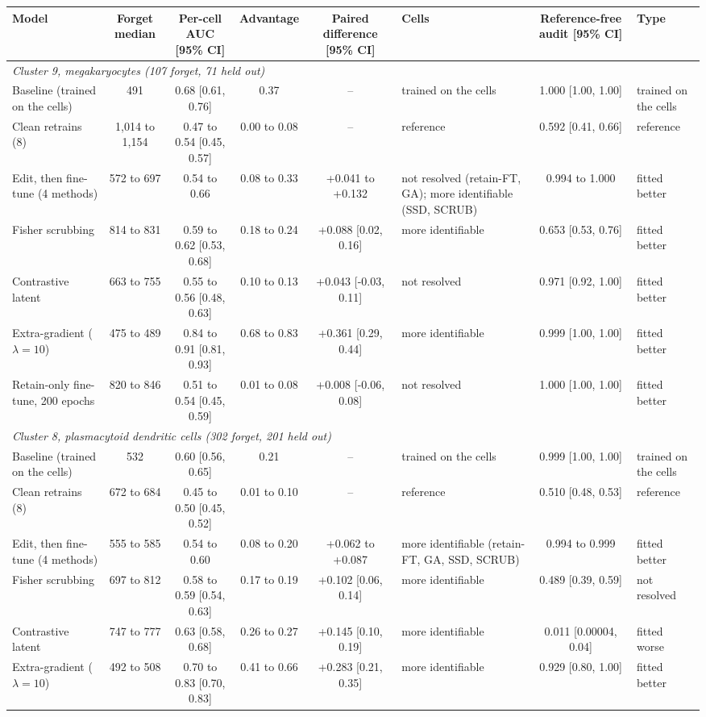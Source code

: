 \begin{tabular}{lcccc>{\raggedright\arraybackslash}p{2.8cm}cl}
\toprule
Model & Forget median & Per-cell AUC [95\% CI] & Advantage & Paired difference [95\% CI] & Cells & Reference-free audit [95\% CI] & Type \\
\midrule
\multicolumn{8}{l}{\emph{Cluster 9, megakaryocytes (107 forget, 71 held out)}} \\
Baseline (trained on the cells) & 491 & 0.68 [0.61, 0.76] & 0.37 & -- & trained on the cells & 1.000 [1.00, 1.00] & trained on the cells \\
Clean retrains (8) & 1,014 to 1,154 & 0.47 to 0.54 [0.45, 0.57] & 0.00 to 0.08 & -- & reference & 0.592 [0.41, 0.66] & reference \\
Edit, then fine-tune (4 methods) & 572 to 697 & 0.54 to 0.66 & 0.08 to 0.33 & +0.041 to +0.132 & not resolved (retain-FT, GA); more identifiable (SSD, SCRUB) & 0.994 to 1.000 & fitted better \\
Fisher scrubbing & 814 to 831 & 0.59 to 0.62 [0.53, 0.68] & 0.18 to 0.24 & +0.088 [0.02, 0.16] & more identifiable & 0.653 [0.53, 0.76] & fitted better \\
Contrastive latent & 663 to 755 & 0.55 to 0.56 [0.48, 0.63] & 0.10 to 0.13 & +0.043 [-0.03, 0.11] & not resolved & 0.971 [0.92, 1.00] & fitted better \\
Extra-gradient ($\lambda=10$) & 475 to 489 & 0.84 to 0.91 [0.81, 0.93] & 0.68 to 0.83 & +0.361 [0.29, 0.44] & more identifiable & 0.999 [1.00, 1.00] & fitted better \\
Retain-only fine-tune, 200 epochs & 820 to 846 & 0.51 to 0.54 [0.45, 0.59] & 0.01 to 0.08 & +0.008 [-0.06, 0.08] & not resolved & 1.000 [1.00, 1.00] & fitted better \\
\midrule
\multicolumn{8}{l}{\emph{Cluster 8, plasmacytoid dendritic cells (302 forget, 201 held out)}} \\
Baseline (trained on the cells) & 532 & 0.60 [0.56, 0.65] & 0.21 & -- & trained on the cells & 0.999 [1.00, 1.00] & trained on the cells \\
Clean retrains (8) & 672 to 684 & 0.45 to 0.50 [0.45, 0.52] & 0.01 to 0.10 & -- & reference & 0.510 [0.48, 0.53] & reference \\
Edit, then fine-tune (4 methods) & 555 to 585 & 0.54 to 0.60 & 0.08 to 0.20 & +0.062 to +0.087 & more identifiable (retain-FT, GA, SSD, SCRUB) & 0.994 to 0.999 & fitted better \\
Fisher scrubbing & 697 to 812 & 0.58 to 0.59 [0.54, 0.63] & 0.17 to 0.19 & +0.102 [0.06, 0.14] & more identifiable & 0.489 [0.39, 0.59] & not resolved \\
Contrastive latent & 747 to 777 & 0.63 [0.58, 0.68] & 0.26 to 0.27 & +0.145 [0.10, 0.19] & more identifiable & 0.011 [0.00004, 0.04] & fitted worse \\
Extra-gradient ($\lambda=10$) & 492 to 508 & 0.70 to 0.83 [0.70, 0.83] & 0.41 to 0.66 & +0.283 [0.21, 0.35] & more identifiable & 0.929 [0.80, 1.00] & fitted better \\
\bottomrule
\end{tabular}
